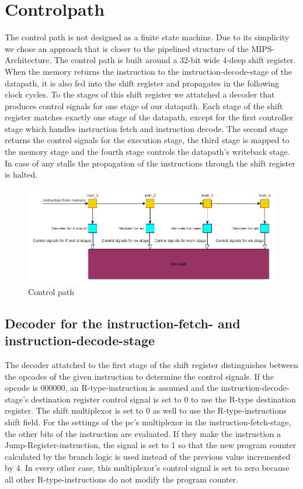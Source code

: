 \section{Controlpath}
The control path is not designed as a finite state machine. Due to its simplicity we chose an approach that is closer to the pipelined structure of the MIPS-Architecture. The control path is built around a 32-bit wide 4-deep shift register. When the memory returns the instruction to the instruction-decode-stage of the datapath, it is also fed into the shift register and propagates in the following clock cycles. To the stages of this shift register we attatched a decoder that produces control signals for one stage of our datapath. Each stage of the shift register matches exactly one stage of the datapath, except for the first controller stage which handles instruction fetch and instruction decode. The second stage returns the control signals for the execution stage, the third stage is mapped to the memory stage and the fourth stage controls the datapath's writeback stage. In case of any stalls the propagation of the instructions through the shift register is halted.
\begin{figure}[h!]
  \centering
  \includegraphics[width=1.0\textwidth]{figure/control.png}
  \caption{Control path}
  \label{fig:control}
\end{figure}
\subsection{Decoder for the instruction-fetch- and instruction-decode-stage}
The decoder attatched to the first stage of the shift register distinguishes between the opcodes of the given instruction to determine the control signals. 
If the opcode is 000000, an R-type-instruction is assumed and the instruction-decode-stage's destination register control signal is set to 0 to use the R-type destination register. 
The shift multiplexor is set to 0 as well to use the R-type-instructions shift field. For the settings of the pc's multiplexor in the instruction-fetch-stage, 
the other bits of the instruction are evaluated. If they make the instruction a Jump-Register-instruction, the signal is set to 1 so that the new program counter calculated by 
the branch logic is used instead of the previous value incremented by 4. In every other case, this multiplexor's control signal is set to zero because all other R-type-instructions 
do not modify the program counter.

